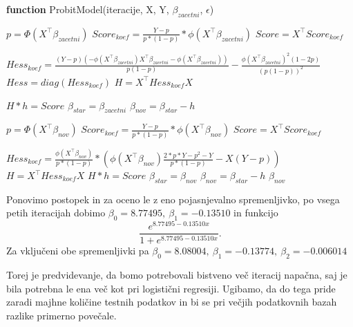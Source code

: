 \documentclass[12pt,a4paper]{amsart}
\theoremstyle{definition} %
\theoremstyle{plain} %
\begin{document}
\begin{algorithm}[H]
    \caption{\textbf{function} ProbitModel(iteracije, X, Y, $\beta_{zacetni}$, $\epsilon$)}
\begin{algorithmic}

    \STATE $p = \Phi(X^\top \beta_{zacetni})$
    \STATE $Score_{koef} = \frac{Y-p}{p*(1-p)} * \phi(X^\top \beta_{zacetni})$
    \STATE $Score = X^\top Score_{koef}$

    \STATE $Hess_{koef} =\frac{(Y-p)(-\phi(X^\top \beta_{zacetni})X^\top \beta_{zacetni} - \phi(X^\top \beta_{zacetni}))}{p(1-p)} - \frac{\phi(X^\top \beta_{zacetni})^2(1-2p)}{(p(1-p))^2}$
    \STATE $Hess = diag(Hess_{koef})$
    \STATE $H = X^\top Hess_{koef} X$
        
    \STATE {} $H * h = Score$
    \STATE $\beta_{star} = \beta_{zacetni}$
    \STATE $\beta_{nov} = \beta_{star} - h$
        
            \STATE $p = \Phi(X^\top \beta_{nov})$
            \STATE $Score_{koef} = \frac{Y-p}{p*(1-p)} * \phi(X^\top \beta_{nov})$
            \STATE $Score = X^\top Score_{koef}$
            
            \STATE $Hess_{koef} = \frac{\phi(X^\top \beta_{nov})}{p*(1-p)} * \left(\phi(X^\top \beta_{nov})\frac{2*p*Y - p^2-Y}{p*(1-p)} - X(Y - p)\right)$
            \STATE $H = X^\top Hess_{koef} X$
            \STATE {}
            \STATE $H * h = Score$ 
            \STATE $\beta_{star} = \beta_{nov}$ 
            \STATE $\beta_{nov} = \beta_{star} - h$ 
        \ELSE
        \STATE {}
        \RETURN $\beta_{nov}$
        \ENDIF
        
    \ENDWHILE
\end{algorithmic}
\end{algorithm}
Ponovimo postopek in za oceno le z eno pojasnjevalno spremenljivko, po vsega petih iteracijah dobimo $\beta_{0} = 8.77495,~\beta_{1} = -0.13510$ in funkcijo
\[
    \frac{e^{8.77495-0.13510x}}{1+e^{8.77495-0.13510x}}.
\]
Za vključeni obe spremenljivki pa $\beta_{0} = 8.08004,~\beta_{1} = -0.13774,~\beta_{2} = -0.006014$

Torej je predvidevanje, da bomo potrebovali bistveno več iteracij napačna, saj je bila potrebna le ena več kot pri logistični regresiji. Ugibamo, da do tega pride zaradi
majhne količine testnih podatkov in bi se pri večjih podatkovnih bazah razlike primerno povečale.
\end{document}
